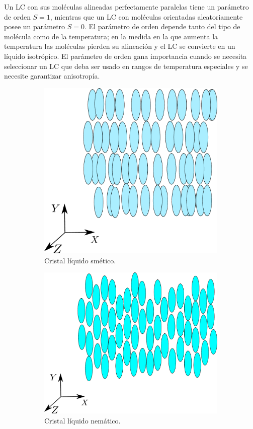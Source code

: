 Un LC con sus moléculas alineadas perfectamente paralelas tiene un
parámetro de orden $S=1$, mientras que un LC con moléculas orientadas
aleatoriamente posee un parámetro $S=0$. El parámetro de orden depende
tanto del tipo de molécula como de la temperatura; en la medida en la
que aumenta la temperatura las moléculas pierden su alineación y el LC
se convierte en un líquido isotrópico. El parámetro de orden gana
importancia cuando se necesita seleccionar un LC que deba ser usado en
rangos de temperatura especiales y se necesite garantizar anisotropía.

\begin{figure}[h!]
\centering
\begin{subfigure}{.4\textwidth}
  \centering
  \includegraphics[width=.6\linewidth]{Smetic_LC}
  \caption{Cristal líquido smético.}
  \label{fig:smetic}
\end{subfigure}\qquad
\begin{subfigure}{.4\textwidth}
  \centering
  \includegraphics[width=.6\linewidth]{Nematic_LC}
  \caption{Cristal líquido nemático.}
  \label{fig:nematic}
\end{subfigure}\\
\begin{subfigure}{.5\textwidth}

\end{subfigure}
\end{figure}
